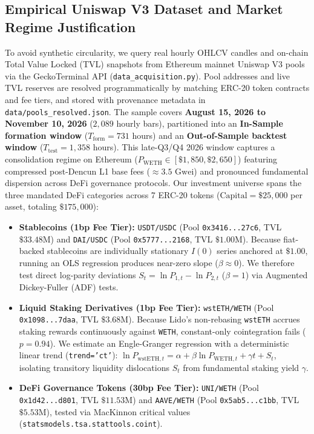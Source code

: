 \documentclass[11pt,a4paper]{article}
\begin{document}
\subsection{Empirical Uniswap V3 Dataset and Market Regime Justification}
To avoid synthetic circularity, we query real hourly OHLCV candles and on-chain Total Value Locked (TVL) snapshots from Ethereum mainnet Uniswap V3 pools via the GeckoTerminal API (\texttt{data\_acquisition.py}). Pool addresses and live TVL reserves are resolved programmatically by matching ERC-20 token contracts and fee tiers, and stored with provenance metadata in \texttt{data/pools\_resolved.json}. The sample covers \textbf{August 15, 2026 to November 10, 2026} ($2,089$ hourly bars), partitioned into an \textbf{In-Sample formation window} ($T_{\text{form}} = 731$ hours) and an \textbf{Out-of-Sample backtest window} ($T_{\text{test}} = 1,358$ hours). This late-Q3/Q4 2026 window captures a consolidation regime on Ethereum ($P_{\text{WETH}} \in [\$1,850, \$2,650]$) featuring compressed post-Dencun L1 base fees ($\approx 3.5\text{ Gwei}$) and pronounced fundamental dispersion across DeFi governance protocols.
Our investment universe spans the three mandated DeFi categories across 7 ERC-20 tokens ($\text{Capital} = \$25,000$ per asset, totaling $\$175,000$):
\begin{itemize}[noitemsep,topsep=2pt,leftmargin=1.5em]
\item \textbf{Stablecoins (1bp Fee Tier):} \texttt{USDT/USDC} (Pool \texttt{0x3416...27c6}, TVL $\$33.48\text{M}$) and \texttt{DAI/USDC} (Pool \texttt{0x5777...2168}, TVL $\$1.00\text{M}$). Because fiat-backed stablecoins are individually stationary $I(0)$ series anchored at $\$1.00$, running an OLS regression produces near-zero slope ($\beta \approx 0$). We therefore test direct log-parity deviations $S_t = \ln P_{1,t} - \ln P_{2,t}$ ($\beta = 1$) via Augmented Dickey-Fuller (ADF) tests.
\item \textbf{Liquid Staking Derivatives (1bp Fee Tier):} \texttt{wstETH/WETH} (Pool \texttt{0x1098...7daa}, TVL $\$3.68\text{M}$). Because Lido's non-rebasing \texttt{wstETH} accrues staking rewards continuously against \texttt{WETH}, constant-only cointegration fails ($p = 0.94$). We estimate an Engle-Granger regression with a deterministic linear trend (\texttt{trend='ct'}): $\ln P_{\text{wstETH},t} = \alpha + \beta \ln P_{\text{WETH},t} + \gamma t + S_t$, isolating transitory liquidity dislocations $S_t$ from fundamental staking yield $\gamma$.
\item \textbf{DeFi Governance Tokens (30bp Fee Tier):} \texttt{UNI/WETH} (Pool \texttt{0x1d42...d801}, TVL $\$11.53\text{M}$) and \texttt{AAVE/WETH} (Pool \texttt{0x5ab5...c1bb}, TVL $\$5.53\text{M}$), tested via MacKinnon critical values (\texttt{statsmodels.tsa.stattools.coint}).
\end{itemize}
\end{document}
